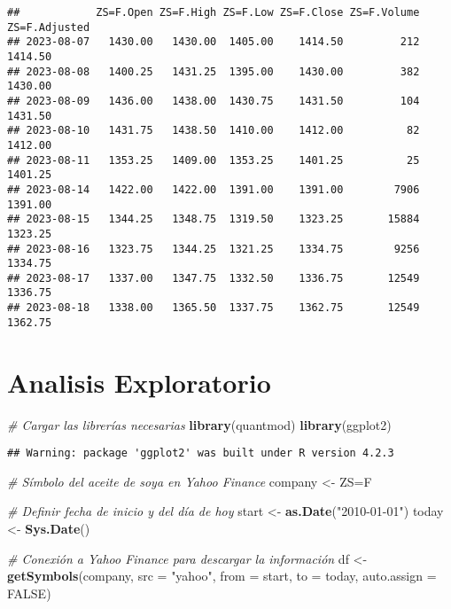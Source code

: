 \documentclass[
]{book}
\newenvironment{Shaded}{\begin{snugshade}}{\end{snugshade}}
\newcommand{\AttributeTok}[1]{\textcolor[rgb]{0.13,0.29,0.53}{#1}}
\newcommand{\CommentTok}[1]{\textcolor[rgb]{0.56,0.35,0.01}{\textit{#1}}}
\newcommand{\ConstantTok}[1]{\textcolor[rgb]{0.56,0.35,0.01}{#1}}
\newcommand{\FunctionTok}[1]{\textcolor[rgb]{0.13,0.29,0.53}{\textbf{#1}}}
\newcommand{\NormalTok}[1]{#1}
\newcommand{\OtherTok}[1]{\textcolor[rgb]{0.56,0.35,0.01}{#1}}
\newcommand{\StringTok}[1]{\textcolor[rgb]{0.31,0.60,0.02}{#1}}
\begin{document}
\begin{verbatim}
##            ZS=F.Open ZS=F.High ZS=F.Low ZS=F.Close ZS=F.Volume ZS=F.Adjusted
## 2023-08-07   1430.00   1430.00  1405.00    1414.50         212       1414.50
## 2023-08-08   1400.25   1431.25  1395.00    1430.00         382       1430.00
## 2023-08-09   1436.00   1438.00  1430.75    1431.50         104       1431.50
## 2023-08-10   1431.75   1438.50  1410.00    1412.00          82       1412.00
## 2023-08-11   1353.25   1409.00  1353.25    1401.25          25       1401.25
## 2023-08-14   1422.00   1422.00  1391.00    1391.00        7906       1391.00
## 2023-08-15   1344.25   1348.75  1319.50    1323.25       15884       1323.25
## 2023-08-16   1323.75   1344.25  1321.25    1334.75        9256       1334.75
## 2023-08-17   1337.00   1347.75  1332.50    1336.75       12549       1336.75
## 2023-08-18   1338.00   1365.50  1337.75    1362.75       12549       1362.75
\end{verbatim}

\hypertarget{analisis-exploratorio}{%
\chapter{Analisis Exploratorio}\label{analisis-exploratorio}}

\begin{Shaded}
\begin{Highlighting}[]
\CommentTok{\# Cargar las librerías necesarias}
\FunctionTok{library}\NormalTok{(quantmod)}
\FunctionTok{library}\NormalTok{(ggplot2)}
\end{Highlighting}
\end{Shaded}

\begin{verbatim}
## Warning: package 'ggplot2' was built under R version 4.2.3
\end{verbatim}

\begin{Shaded}
\begin{Highlighting}[]
\CommentTok{\# Símbolo del aceite de soya en Yahoo Finance}
\NormalTok{company }\OtherTok{\textless{}{-}} \StringTok{\textquotesingle{}ZS=F\textquotesingle{}}

\CommentTok{\# Definir fecha de inicio y del día de hoy}
\NormalTok{start }\OtherTok{\textless{}{-}} \FunctionTok{as.Date}\NormalTok{(}\StringTok{"2010{-}01{-}01"}\NormalTok{)}
\NormalTok{today }\OtherTok{\textless{}{-}} \FunctionTok{Sys.Date}\NormalTok{()}

\CommentTok{\# Conexión a Yahoo Finance para descargar la información}
\NormalTok{df }\OtherTok{\textless{}{-}} \FunctionTok{getSymbols}\NormalTok{(company, }\AttributeTok{src =} \StringTok{"yahoo"}\NormalTok{, }\AttributeTok{from =}\NormalTok{ start, }\AttributeTok{to =}\NormalTok{ today, }\AttributeTok{auto.assign =} \ConstantTok{FALSE}\NormalTok{)}
\end{Highlighting}
\end{Shaded}
\end{document}
